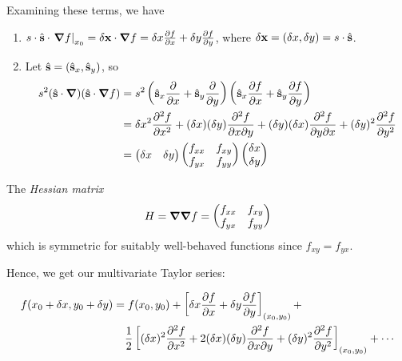 \documentclass{../../template/note}
\begin{document}
    Examining these terms, we have
    \begin{enumerate}[label=\protect\circled{\arabic*}]
        \item \(s \cdot \hvec s \cdot \left.\grad f\right|_{x_0} = \delta \vec x \cdot \grad f = \delta x \pd f x + \delta y \pd f y\), where \(\delta \vec x = (\delta x, \delta y) = s \cdot \hvec s\).
        \item Let \(\hvec s = (\hvec s_x, \hvec s_y)\), so
        \begin{align*}
            s^2 (\hvec s \cdot \grad)(\hvec s \cdot \grad f) &= s^2\left(\hvec s_x \pd{}{x} + \hvec s_y \pd{}{y}\right)\left(\hvec s_x \pd{f}{x} + \hvec s_y \pd{f}{y}\right) \\
            &= {\delta x}^2 \pd{^2f}{x^2} + (\delta x)(\delta y) \pd{^2f}{x \partial y} + (\delta y)(\delta x) \pd{^2f}{y \partial x} + (\delta y)^2 \pd{^2f}{y^2} \\
            &= \begin{pmatrix}
             \delta x & \delta y \\
            \end{pmatrix} \begin{pmatrix}
             f_{xx} & f_{xy} \\
             f_{yx} & f_{yy} \\
            \end{pmatrix} \begin{pmatrix}
             \delta x \\
             \delta y \\
            \end{pmatrix}
        \end{align*}
    \end{enumerate}
    
    \begin{definition}
        The \emph{Hessian matrix}
        \[
            H = \grad \grad f = \begin{pmatrix}
             f_{xx} & f_{xy} \\
             f_{yx} & f_{yy} \\
            \end{pmatrix}
        \]
        which is symmetric for suitably well-behaved functions since \(f_{xy} = f_{yx}\).
    \end{definition}
    
    Hence, we get our multivariate Taylor series:

    \begin{align*}
        f(x_0 + \delta x, y_0 + \delta y) =&\; f(x_0, y_0) + \left[\delta x \pd f x + \delta y \pd f y\right]_{(x_0,y_0)} + \\ &\frac{1}{2}\left[(\delta x)^2 \pd{^2f}{x^2} + 2(\delta x)(\delta y)\pd{^2f}{x \partial y} + (\delta y)^2 \pd{^2f}{y^2}\right]_{(x_0, y_0)} + \cdots \\
    \end{align*}
    
\end{document}
